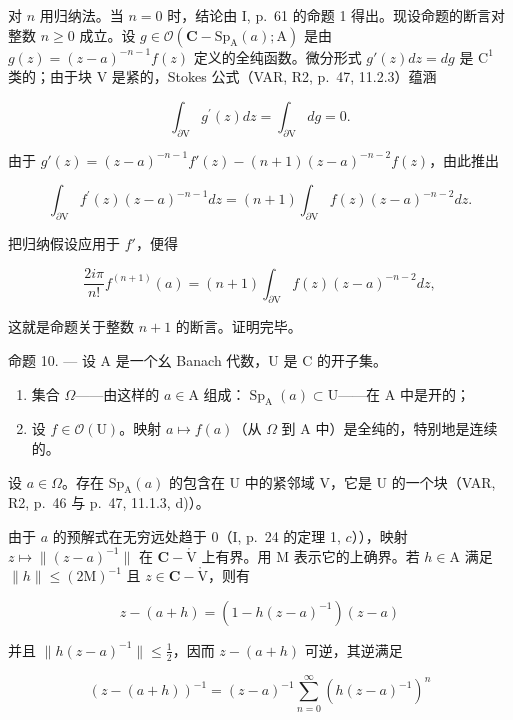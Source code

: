 对 \(n\) 用归纳法。当 \(n = 0\) 时，结论由 I, p.~61 的命题 1 得出。现设命题的断言对整数 \(n \geqslant 0\) 成立。设 \(g \in \mathcal{O}(\mathbf{C} - \mathrm{Sp}_{\mathrm{A}}(a); \mathrm{A})\) 是由 \(g(z) = (z - a)^{-n-1} f(z)\) 定义的全纯函数。微分形式 \(g'(z) dz = dg\) 是 \(\mathrm{C}^1\) 类的；由于块 V 是紧的，Stokes 公式（VAR, R2, p.~47, 11.2.3）蕴涵

\[
\int_ {\partial \mathrm{V}} g ^ {\prime} (z) d z = \int_ {\partial \mathrm{V}} d g = 0.
\]

由于 \(g'(z) = (z - a)^{-n-1} f'(z) - (n+1)(z - a)^{-n-2} f(z)\)，由此推出

\[
\int_ {\partial \mathrm{V}} f ^ {\prime} (z) (z - a) ^ {- n - 1} d z = (n + 1) \int_ {\partial \mathrm{V}} f (z) (z - a) ^ {- n - 2} d z.
\]

把归纳假设应用于 \(f'\)，便得

\[
\frac {2 i \pi}{n !} f ^ {(n + 1)} (a) = (n + 1) \int_ {\partial \mathrm{V}} f (z) (z - a) ^ {- n - 2} d z,
\]

这就是命题关于整数 \(n+1\) 的断言。证明完毕。

命题 10. --- 设 A 是一个幺 Banach 代数，U 是 C 的开子集。

\begin{enumerate}
\def\labelenumi{\alph{enumi})}
\tightlist
\item
  集合 \(\Omega\)——由这样的 \(a \in \mathrm{A}\) 组成：\(\operatorname{Sp}_{\mathrm{A}}(a) \subset \mathrm{U}\)——在 A 中是开的；
\item
  设 \(f \in \mathcal{O}(\mathrm{U})\)。映射 \(a \mapsto f(a)\)（从 \(\Omega\) 到 A 中）是全纯的，特别地是连续的。
\end{enumerate}

设 \(a \in \Omega\)。存在 \(\mathrm{Sp}_{\mathrm{A}}(a)\) 的包含在 U 中的紧邻域 V，它是 U 的一个块（VAR, R2, p.~46 与 p.~47, 11.1.3, d)）。

由于 \(a\) 的预解式在无穷远处趋于 0（I, p.~24 的定理 1, \(c\)）），映射 \(z \mapsto \| (z - a)^{-1}\|\) 在 \(\mathbf{C} - \mathring{\mathrm{V}}\) 上有界。用 M 表示它的上确界。若 \(h \in \mathrm{A}\) 满足 \(\| h\| \leqslant (2\mathrm{M})^{-1}\) 且 \(z \in \mathbf{C} - \mathring{\mathrm{V}}\)，则有

\[
z - (a + h) = (1 - h (z - a) ^ {- 1}) (z - a)
\]

并且 \(\|h(z-a)^{-1}\|\leqslant\frac{1}{2}\)，因而 \(z-(a+h)\) 可逆，其逆满足

\[
(z - (a + h)) ^ {- 1} = (z - a) ^ {- 1} \sum_ {n = 0} ^ {\infty} (h (z - a) ^ {- 1}) ^ {n}\tag{8}
\]


